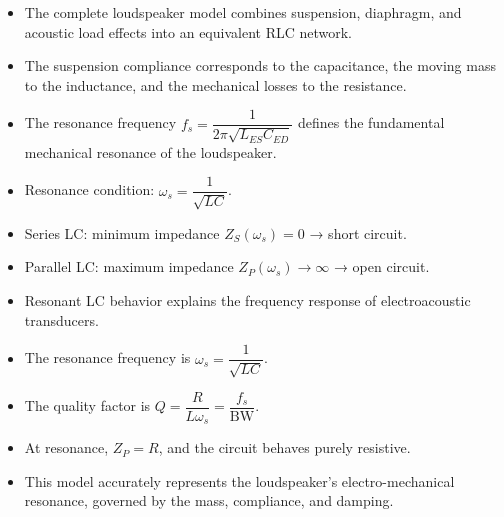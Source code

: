 \begin{tcolorbox}[colback=gray!5,colframe=gray!50!black,title=Key Points]
\begin{itemize}
    \item The complete loudspeaker model combines suspension, diaphragm, and acoustic load effects into an equivalent RLC network.
    \item The suspension compliance corresponds to the capacitance, the moving mass to the inductance, and the mechanical losses to the resistance.
    \item The resonance frequency \( f_s = \dfrac{1}{2\pi\sqrt{L_{ES} C_{ED}}} \) defines the fundamental mechanical resonance of the loudspeaker.
\end{itemize}
\end{tcolorbox}


\begin{tcolorbox}[colback=gray!5,colframe=gray!50!black,title=Key Points]
\begin{itemize}
    \item Resonance condition: \( \omega_s = \dfrac{1}{\sqrt{L C}} \).
    \item Series LC: minimum impedance \( Z_S(\omega_s) = 0 \) → short circuit.
    \item Parallel LC: maximum impedance \( Z_P(\omega_s) \rightarrow \infty \) → open circuit.
    \item Resonant LC behavior explains the frequency response of electroacoustic transducers.
\end{itemize}
\end{tcolorbox}

\begin{tcolorbox}[colback=gray!5,colframe=gray!50!black,title=Key Points]
\begin{itemize}
    \item The resonance frequency is \( \omega_s = \dfrac{1}{\sqrt{L C}} \).
    \item The quality factor is \( Q = \dfrac{R}{L \omega_s} = \dfrac{f_s}{\text{BW}} \).
    \item At resonance, \( Z_P = R \), and the circuit behaves purely resistive.
    \item This model accurately represents the loudspeaker’s electro-mechanical resonance, governed by the mass, compliance, and damping.
\end{itemize}
\end{tcolorbox}

